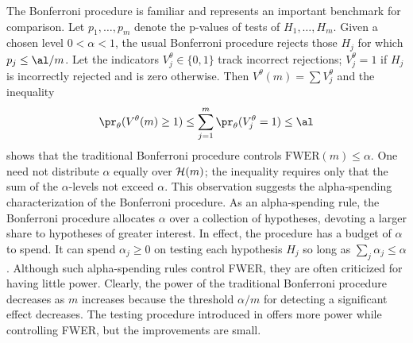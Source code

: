 \documentclass[12pt]{article}
\begin{document}
The Bonferroni procedure is familiar and represents an important
benchmark for comparison.  Let $p_1, \ldots, p_m$ denote the p-values
of tests of $H_1, \ldots, H_m$.  Given a chosen level $0 < \alpha < 1$,
the usual Bonferroni procedure rejects those $H_j$ for which $p_j \le
\al/m$.  Let the indicators $V^\theta_j \in \{0, 1\}$ track incorrect
rejections; $V^\theta_j = 1$ if $H_j$ is incorrectly rejected and is
zero otherwise.  Then $V^\theta(m) = \sum V^{\theta}_{j}$ and the
inequality
\begin{equation}
  \pr_\theta(V^\theta(m) \ge 1) 
     \le \sum_{j=1}^m \pr_\theta(V^{\theta}_{j} = 1) \le \al
\label{eq:Bon}
\end{equation}
shows that the traditional Bonferroni procedure controls
$\mbox{FWER}(m) \le \alpha$.  One need not distribute $\alpha$ equally
over ${\cal H}(m)$; the inequality  requires only that the
sum of the $\alpha$-levels not exceed $\alpha$.  This observation
suggests the alpha-spending characterization of the Bonferroni
procedure.  As an alpha-spending rule, the Bonferroni procedure
allocates $\alpha$ over a collection of hypotheses, devoting a larger
share to hypotheses of greater interest.  In effect, the procedure has
a budget of $\alpha$ to spend.  It can spend $\alpha_j \ge 0$ on
testing each hypothesis $H_j$ so long as $\sum_j \alpha_j \le \alpha$.
Although such alpha-spending rules control FWER, they are often
criticized for having little power.  Clearly, the power of the
traditional Bonferroni procedure decreases as $m$ increases because
the threshold $\alpha/m$ for detecting a significant effect decreases.
The testing procedure introduced in \citet{holm79} offers more power
while controlling FWER, but the improvements are small.
 
\end{document}
